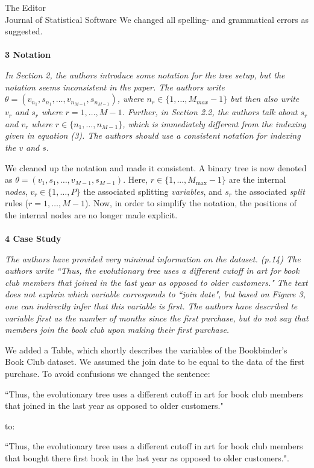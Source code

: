 \documentclass[DIN, pagenumber=false, parskip=half,%
               fromalign=left, fromphone=true,%
               fromemail=true, fromurl=false, %
               fromlogo=true, fromrule=false, fromrule=afteraddress]{scrlttr2}
\begin{document}
\begin{letter}{The Editor \\ Journal of Statistical Software}
We changed all spelling- and grammatical errors as suggested.
\\  \\
\textbf{3 Notation}

\textit{In Section 2, the authors introduce some notation for the tree setup, but the notation seems inconsistent in the paper. The authors write $\theta=(v_{n_1}, s_{n_1},\dots,v_{n_{M-1}},s_{n_{M-1}})$, where $n_r \in \{1,\dots, M_{max}-1\}$ but then also write $v_r$ and $s_r$ where $r=1,\dots,M-1$. Further, in Section 2.2, the authors talk about $s_r$ and $v_r$ where $r \in \{n_1, \dots, n_{M-1} \}$, which is immediately different from the indexing given
in equation (3). The authors should use a consistent notation for indexing the $v$ and $s$.}

We cleaned up the notation and made it consistent. A binary tree is now denoted as $\theta=(v_1, s_1, \dots, v_{M-1}, s_{M-1})$. Here, $r \in \{1,...,M_{\max}-1\}$ are the internal \emph{nodes}, $v_r \in \{1, \dots ,P\}$ the associated splitting \emph{variables}, and $s_r$ the associated \emph{split} rules ($r = 1, \dots, M-1$). Now, in order to simplify the notation, the positions of the internal nodes are no longer made explicit. 
\\  \\
\textbf{4 Case Study}

\textit{
The authors have provided very minimal information on the dataset. (p.14) The authors write
``Thus, the evolutionary tree uses a different cutoff in art for book club members that joined in the last year as opposed to older customers." The text does not explain which variable corresponds to ``join date", but based on Figure 3, one can indirectly infer that this variable is first. The authors have described te variable first as the number of months since the first purchase, but do not say that members join the book club upon making their first purchase.}

We added a Table, which shortly describes the variables of the Bookbinder's Book Club dataset. We assumed the join date to be equal to the data of the first purchase. To avoid confusions we changed the sentence: 

``Thus, the evolutionary tree uses a different cutoff in art for book club members that joined in the last year as opposed to older customers." 

to: 

``Thus, the evolutionary tree uses a different cutoff in art for book club members that bought there first book in the last year as opposed to older customers.".
\\ \\


\end{letter}
\end{document}

